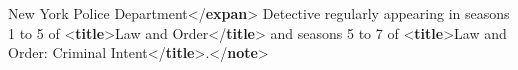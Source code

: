 \begin{shaded}
\hspace*{1em}\hspace*{1em}\hspace*{1em}\hspace*{1em}New York Police\mbox{}\newline 
\hspace*{1em}\hspace*{1em}\hspace*{1em}\hspace*{1em}\hspace*{1em}\hspace*{1em}\hspace*{1em}\hspace*{1em}\hspace*{1em}\hspace*{1em} Department{</\textbf{expan}>}\mbox{}\newline 
\hspace*{1em}\hspace*{1em}\hspace*{1em} Detective regularly appearing in\mbox{}\newline 
\hspace*{1em}\hspace*{1em}\hspace*{1em}\hspace*{1em}\hspace*{1em}\hspace*{1em} seasons 1 to 5 of {<\textbf{title}>}Law and Order{</\textbf{title}>} and seasons 5 to 7\mbox{}\newline 
\hspace*{1em}\hspace*{1em}\hspace*{1em}\hspace*{1em}\hspace*{1em}\hspace*{1em} of {<\textbf{title}>}Law and Order: Criminal Intent{</\textbf{title}>}.{</\textbf{note}>}\mbox{}\newline 
\hspace*{1em}\mbox{}\newline 
\hspace*{1em}\mbox{}\newline 

\end{shaded}
